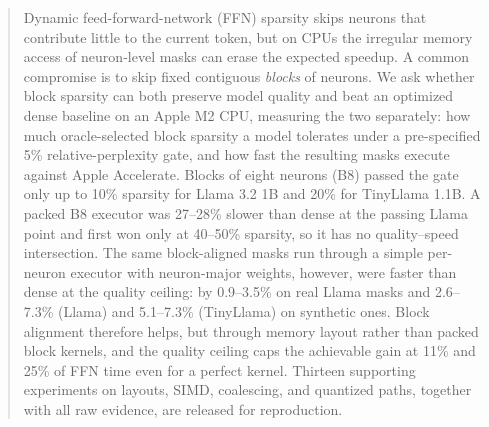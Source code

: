 \begin{abstract}
Dynamic feed-forward-network (FFN) sparsity skips neurons that contribute
little to the current token, but on CPUs the irregular memory access of
neuron-level masks can erase the expected speedup. A common compromise is to
skip fixed contiguous \emph{blocks} of neurons. We ask whether block sparsity
can both preserve model quality and beat an optimized dense baseline on an
Apple M2 CPU, measuring the two separately: how much oracle-selected block
sparsity a model tolerates under a pre-specified 5\% relative-perplexity gate,
and how fast the resulting masks execute against Apple Accelerate. Blocks of
eight neurons (B8) passed the gate only up to 10\% sparsity for Llama 3.2 1B
and 20\% for TinyLlama 1.1B. A packed B8 executor was 27--28\% slower than
dense at the passing Llama point and first won only at 40--50\% sparsity, so it
has no quality--speed intersection. The same block-aligned masks run through a
simple per-neuron executor with neuron-major weights, however, were faster
than dense at the quality ceiling: by 0.9--3.5\% on real Llama masks and
2.6--7.3\% (Llama) and 5.1--7.3\% (TinyLlama) on synthetic ones. Block
alignment therefore helps, but through memory layout rather than packed block
kernels, and the quality ceiling caps the achievable gain at 11\% and 25\% of
FFN time even for a perfect kernel. Thirteen supporting experiments on
layouts, SIMD, coalescing, and quantized paths, together with all raw
evidence, are released for reproduction.
\end{abstract}
